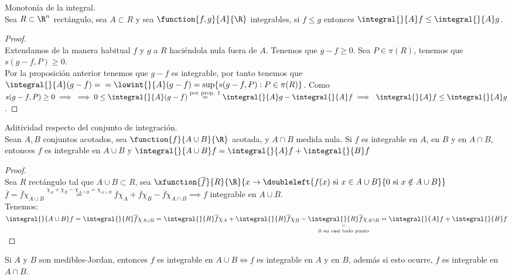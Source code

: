 	\begin{proposicion} Monotonía de la integral.\\	
	Sea $R\subset \R^n$ rectángulo, sea $A\subset R$ y sea $\function{f,g}{A}{\R}$ integrables, si $f\leq g$ entonces $\integral{}{A}f\leq\integral{}{A}g$.
	\begin{proof}\ \\
	Extendamos de la manera habitual $f$ y $g$ a $R$ haciéndola nula fuera de $A$. Tenemos que $g-f\geq 0$. Sea $P\in\pi(R)$, tenemos que $s(g-f,P)\geq 0$.\\
	Por la proposición anterior tenemos que $g-f$ es integrable, por tanto tenemos que $\integral{}{A}(g-f)=\\=\lowint{}{A}(g-f)=\sup\{s(g-f,P):P\in\pi(R)\}$. Como $s(g-f,P)\geq 0\implies\\\implies 0\leq \integral{}{A}(g-f)\overset{\mathrm{por\ prop.\ 1}}=\integral{}{A}g-\integral{}{A}f\implies\ \integral{}{A}f\leq\integral{}{A}g$. 
	\end{proof}
	\end{proposicion}
	
	\begin{proposicion} Aditividad respecto del conjunto de integración.\\
	Sean $A,B$ conjuntos acotados, sea $\function{f}{A\cup B}{\R}$ acotada, y $A\cap B$ medida nula. Si $f$ es integrable en $A$, en $B$ y en $A\cap B$, entonces $f$ es integrable en $A\cup B$ y $\integral{}{A\cup B}f=\integral{}{A}f+\integral{}{B}f$
	\begin{proof}\ \\
	Sea $R$ rectángulo tal que $A\cup B \subset R$, sea $\xfunction{\overline{f}}{R}{\R}{x\to\doubleleft{f(x)\ \mathrm{si\ }x\in A\cup B}{0\ \mathrm{si\ }x\notin A\cup B}}$\\
	$\overline{f}=\overline{f}\chi_{A\cup B}\overset{\chi_A+\chi_B-\chi_{A\cap B}=\chi_{A\cup B}}=\overline{f}\chi_A+\overline{f}\chi_B-\overline{f}\chi_{A\cap B}\implies f$ integrable en $A\cup B$.\\
	Tenemos:\\
	$\integral{}{A\cup B}f=\integral{}{R}\overline{f}\chi_{A\cup B}=\integral{}{R}\overline{f}\chi_A + \integral{}{R}\overline{f}\chi_B -\underset{0\mathrm{\ en\ casi\ todo\ punto}}	{\underset{\shortparallel}{\integral{}{R}\overline{f}\chi_{A\cap B}}}=\integral{}{A}f+\integral{}{B}f$
	\end{proof}
	\end{proposicion}
	
	\begin{observacion} Si $A$ y $B$ son medibles-Jordan, entonces $f$ es integrable en $A\cup B\iff f$ es integrable en $A$ y en $B$, además si esto ocurre, $f$ es integrable en $A\cap B$.
	\end{observacion}
	
